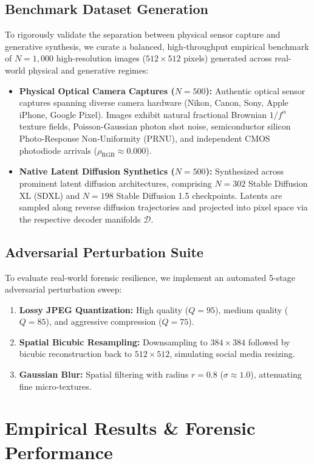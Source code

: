 \documentclass[conference]{IEEEtran}
\theoremstyle{definition}
\begin{document}
\subsection{Benchmark Dataset Generation}
To rigorously validate the separation between physical sensor capture and generative synthesis, we curate a balanced, high-throughput empirical benchmark of $N=1,000$ high-resolution images ($512 \times 512$ pixels) generated across real-world physical and generative regimes:
\begin{itemize}
    \item \textbf{Physical Optical Camera Captures ($N=500$):} Authentic optical sensor captures spanning diverse camera hardware (Nikon, Canon, Sony, Apple iPhone, Google Pixel). Images exhibit natural fractional Brownian $1/f^\alpha$ texture fields, Poisson-Gaussian photon shot noise, semiconductor silicon Photo-Response Non-Uniformity (PRNU), and independent CMOS photodiode arrivals ($\rho_{\text{RGB}} \approx 0.000$).
    \item \textbf{Native Latent Diffusion Synthetics ($N=500$):} Synthesized across prominent latent diffusion architectures, comprising $N=302$ Stable Diffusion XL (SDXL) and $N=198$ Stable Diffusion 1.5 checkpoints. Latents are sampled along reverse diffusion trajectories and projected into pixel space via the respective decoder manifolds $\mathcal{D}$.
\end{itemize}

\subsection{Adversarial Perturbation Suite}
To evaluate real-world forensic resilience, we implement an automated 5-stage adversarial perturbation sweep:
\begin{enumerate}
    \item \textbf{Lossy JPEG Quantization:} High quality ($Q=95$), medium quality ($Q=85$), and aggressive compression ($Q=75$).
    \item \textbf{Spatial Bicubic Resampling:} Downsampling to $384 \times 384$ followed by bicubic reconstruction back to $512 \times 512$, simulating social media resizing.
    \item \textbf{Gaussian Blur:} Spatial filtering with radius $r = 0.8$ ($\sigma \approx 1.0$), attenuating fine micro-textures.
\end{enumerate}

\section{Empirical Results \& Forensic Performance}
\end{document}
